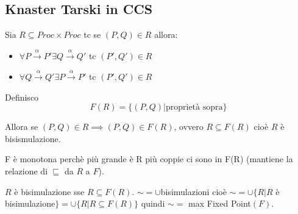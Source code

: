 \documentclass{article}
\newcommand{\passo}{\xrightarrow{\alpha}}
\begin{document}
\subsection{Knaster Tarski in CCS}

Sia $R \subseteq Proc \times Proc$ tc se $(P, Q) \in R$ allora:
\begin{itemize}
    \item $\forall P \passo P' \exists Q \passo Q'$ tc $(P', Q') \in R$
    \item $\forall Q \passo Q' \exists P \passo P'$ tc $(P', Q') \in R$
\end{itemize}

Definisco $$F(R) = \{ (P,Q) | \text{proprietà sopra} \} $$

Allora se $(P,Q) \in R \implies (P,Q) \in F(R)$, ovvero $R \subseteq F(R)$ cioè $R$ è bisismulazione.

F è monotona perchè più grande è R più coppie ci sono in F(R) (mantiene la relazione di $\sqsubseteq$ da $R$ a $F$).

$R$ è bisimulazione sse $R \subseteq F(R)$. $ \sim= \cup$bisimulazioni cioè $\sim = \cup \{ R |R $ è bisimulazione$\} = \cup \{R | R \subseteq F(R)\} $ quindi $\sim = $ max Fixed Point$(F)$.
\end{document}
